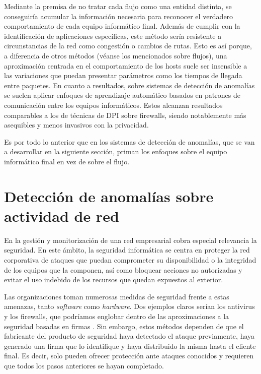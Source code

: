 Mediante la premisa de no tratar cada flujo como una entidad distinta, se conseguiría acumular la información necesaria para reconocer el verdadero comportamiento de cada equipo informático final.
Además de cumplir con la identificación de aplicaciones específicas, este método sería resistente a circunstancias de la red como congestión o cambios de rutas.
Esto es así porque, a diferencia de otros métodos (véanse los mencionados sobre flujos), una aproximación centrada en el comportamiento de los hosts
suele ser insensible a las variaciones que puedan presentar parámetros como los tiempos de llegada entre paquetes.
En cuanto a resultados, sobre sistemas de detección de anomalías se suelen aplicar enfoques de aprendizaje automático basados en patrones de comunicación entre los equipos informáticos.
Estos alcanzan resultados comparables a los de técnicas de DPI sobre firewalls, siendo notablemente más asequibles y menos invasivos con la privacidad.

Es por todo lo anterior que en los sistemas de detección de anomalías, que se van a desarrollar en la siguiente sección, priman los enfoques sobre el equipo informático final en vez de sobre el flujo.

\section{Detección de anomalías sobre actividad de red}\label{detectanomsobreactividadred}

En la gestión y monitorización de una red empresarial cobra especial relevancia la seguridad.
En este ámbito, la seguridad informática se centra en proteger la red corporativa de ataques que puedan comprometer su disponibilidad o la integridad de los equipos que la componen, así como
bloquear acciones no autorizadas y evitar el uso indebido de los recursos que quedan expuestos al exterior.

Las organizaciones toman numerosas medidas de seguridad frente a estas amenazas, tanto \emph{software} como \emph{hardware}.
Dos ejemplos claros serían los antivirus y los firewalls, que podríamos englobar dentro de las aproximaciones a la seguridad basadas en firmas \cite{Alconzo_2019}.
Sin embargo, estos métodos dependen de que el fabricante del producto de seguridad haya detectado el ataque previamente, haya generado una firma que lo identifique y haya distribuido la misma hasta el cliente final.
Es decir, solo pueden ofrecer protección ante ataques conocidos y requieren que todos los pasos anteriores se hayan completado.

